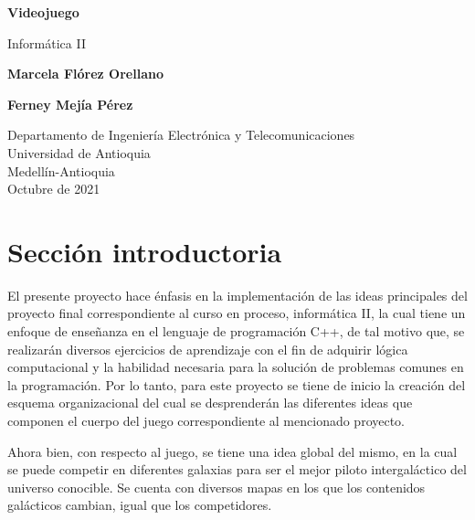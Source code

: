 \documentclass{article}
\begin{document}
\begin{titlepage}
    \begin{center}
        \vspace*{1cm}
            
        \Huge
        \textbf{Videojuego}
            
        \vspace{0.5cm}
        \LARGE
        Informática II
            
            
        \vspace{1.5cm}
        
        \textbf{Marcela Flórez Orellano} 
        
        \vspace{0.3cm}
        \LARGE
        
        \textbf{Ferney Mejía Pérez}
            
        \vfill
            
        \vspace{0.8cm}
            
        \Large
        Departamento de Ingeniería Electrónica y Telecomunicaciones\\
        Universidad de Antioquia\\
        Medellín-Antioquia\\
        Octubre de 2021
         
            
    \end{center}
\end{titlepage}


\tableofcontents
\newpage


\section{Sección introductoria}\label{intro}
El presente proyecto hace énfasis en la implementación de las ideas principales del proyecto final correspondiente al curso en proceso, informática II, la cual tiene un enfoque de enseñanza en el lenguaje de programación C++, de tal motivo que, se realizarán diversos ejercicios de aprendizaje con el fin de adquirir lógica computacional y la habilidad necesaria para la solución de problemas comunes en la programación. Por lo tanto, para este proyecto se tiene de inicio la creación del esquema organizacional del cual se desprenderán las diferentes ideas que componen el cuerpo del juego correspondiente al mencionado proyecto.

Ahora bien, con respecto al juego, se tiene una idea global del mismo, en la cual se puede competir en diferentes galaxias para ser el mejor piloto intergaláctico del universo conocible. Se cuenta con diversos mapas en los que los contenidos galácticos cambian, igual que los competidores.  
\end{document}

